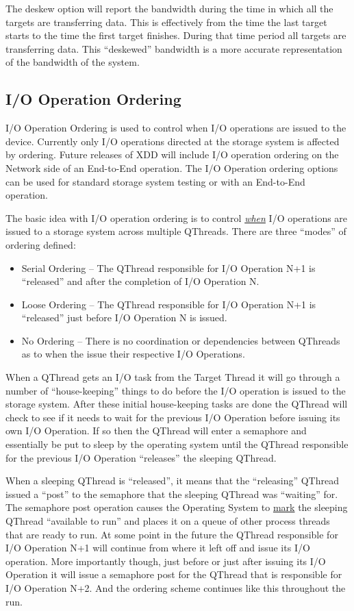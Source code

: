The deskew option will report the bandwidth during the time in which all the targets are transferring data. This is effectively from the time the last target starts to the time the first target finishes. During that time period all targets are transferring data. This ``deskewed'' bandwidth is a more accurate representation of the bandwidth of the system.

\subsection{I/O Operation Ordering}\label{io-operation-ordering}

I/O Operation Ordering is used to control when I/O operations are issued to the device. Currently only I/O operations directed at the storage system is affected by ordering. Future releases of XDD will include I/O operation ordering on the Network side of an End-to-End operation. The I/O Operation ordering options can be used for standard storage system testing or with an End-to-End operation.

The basic idea with I/O operation ordering is to control \emph{\ul{when}} I/O operations are issued to a storage system across multiple QThreads. There are three ``modes'' of ordering defined:

\begin{itemize}
\item
  Serial Ordering -- The QThread responsible for I/O Operation N+1 is ``released'' and after the completion of I/O Operation N.
\item
  Loose Ordering -- The QThread responsible for I/O Operation N+1 is ``released'' just before I/O Operation N is issued.
\item
  No Ordering -- There is no coordination or dependencies between QThreads as to when the issue their respective I/O Operations.
\end{itemize}

When a QThread gets an I/O task from the Target Thread it will go through a number of ``house-keeping'' things to do before the I/O operation is issued to the storage system. After these initial house-keeping tasks are done the QThread will check to see if it needs to wait for the previous I/O Operation before issuing its own I/O Operation. If so then the QThread will enter a semaphore and essentially be put to sleep by the operating system until the QThread responsible for the previous I/O Operation ``releases'' the sleeping QThread.

When a sleeping QThread is ``released'', it means that the ``releasing'' QThread issued a ``post'' to the semaphore that the sleeping QThread was ``waiting'' for. The semaphore post operation causes the Operating System to \ul{mark} the sleeping QThread ``available to run'' and places it on a queue of other process threads that are ready to run. At some point in the future the QThread responsible for I/O Operation N+1 will continue from where it left off and issue its I/O operation. More importantly though, just before or just after issuing its I/O Operation it will issue a semaphore post for the QThread that is responsible for I/O Operation N+2. And the ordering scheme continues like this throughout the run.


